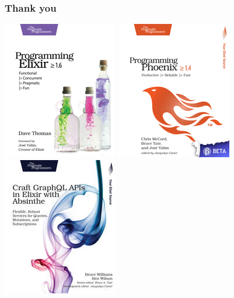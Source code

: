\documentclass{beamer}
\begin{document}
\begin{frame}
\frametitle{Thank you}
\includegraphics[width=.33\textwidth]{elixir16}
\includegraphics[width=.33\textwidth]{phoenix14}
\includegraphics[width=.33\textwidth]{wwgraphql}
\end{frame}
\end{document}
